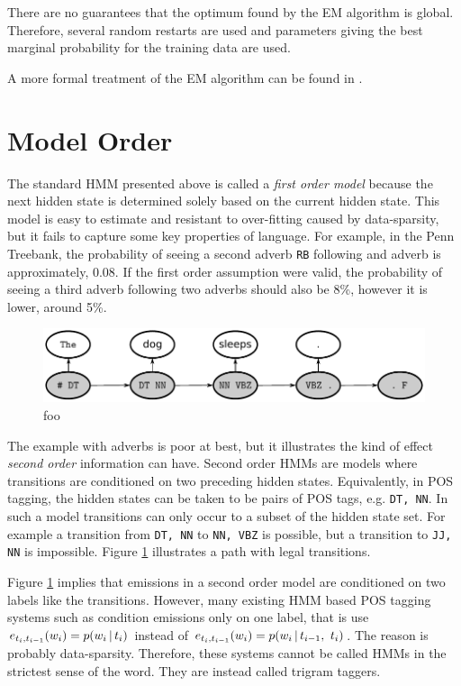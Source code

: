There are no guarantees that the optimum found by the EM algorithm is
global. Therefore, several random restarts are used and parameters
giving the best marginal probability for the training data are used. 

A more formal treatment of the EM algorithm can be found in \cite{Blimes1997}.

\section{Model Order}

The standard HMM presented above is called a {\it first order model}
because the next hidden state is determined solely based on the
current hidden state. This model is easy to estimate and resistant to
over-fitting caused by data-sparsity, but it fails to capture some key
properties of language. For example, in the Penn Treebank, the
probability of seeing a second adverb {\tt RB} following and adverb
is approximately, 0.08. If the first order assumption were valid, the
probability of seeing a third adverb following two adverbs should also
be 8\%, however it is lower, around 5\%.

\begin{figure}[!htb]
\begin{center}
\includegraphics[scale=.7]{snd_order_path}
\caption{foo}\label{second-order-fig}
\end{center}
\end{figure}

The example with adverbs is poor at best, but it illustrates the kind
of effect {\it second order} information can have. Second order HMMs
are models where transitions are conditioned on two preceding hidden
states. Equivalently, in POS tagging, the hidden states can be taken
to be pairs of POS tags, e.g. {\tt DT, NN}. In such a model
transitions can only occur to a subset of the hidden state set. For
example a transition from {\tt DT, NN} to {\tt NN, VBZ} is possible,
but a transition to {\tt JJ, NN} is impossible. Figure
\ref{second-order-fig} illustrates a path with legal transitions. 

Figure \ref{second-order-fig} implies that emissions in a second order
model are conditioned on two labels like the transitions. However,
many existing HMM based POS tagging systems such as \cite{Brants2000}
condition emissions only on one label, that is use $e_{t_i, t_{i -
    1}}(w_i) = p(w_i \mbox{$ \, | \, $} t_i)$ instead of $e_{t_i, t_{i - 1}}(w_i) =
p(w_i \mbox{$ \, | \, $} t_{i - 1},\ t_{i})$. The reason is probably
data-sparsity. Therefore, these systems cannot be called HMMs in the
strictest sense of the word. They are instead called trigram
taggers. 

